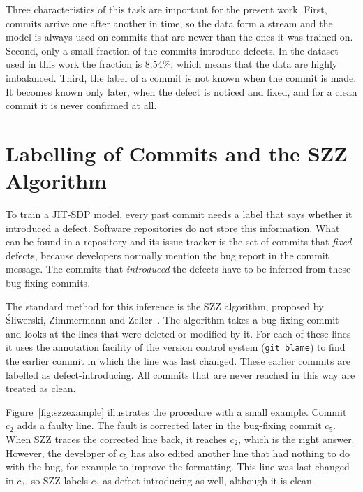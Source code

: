 \documentclass[12pt,a4paper,oneside]{report}
\begin{document}
Three characteristics of this task are important for the present work. First,
commits arrive one after another in time, so the data form a stream and the
model is always used on commits that are newer than the ones it was trained
on. Second, only a small fraction of the commits introduce defects. In the
dataset used in this work the fraction is 8.54\%, which means that the data
are highly imbalanced. Third, the label of a commit is not known when the
commit is made. It becomes known only later, when the defect is noticed and
fixed, and for a clean commit it is never confirmed at all.

\section{Labelling of Commits and the SZZ Algorithm}

To train a JIT-SDP model, every past commit needs a label that says whether
it introduced a defect. Software repositories do not store this information.
What can be found in a repository and its issue tracker is the set of commits
that \emph{fixed} defects, because developers normally mention the bug report
in the commit message. The commits that \emph{introduced} the defects have to
be inferred from these bug-fixing commits.

The standard method for this inference is the SZZ algorithm, proposed by
\'{S}liwerski, Zimmermann and Zeller~\cite{sliwerski2005szz}. The algorithm
takes a bug-fixing commit and looks at the lines that were deleted or modified
by it. For each of these lines it uses the annotation facility of the version
control system (\texttt{git blame}) to find the earlier commit in which the
line was last changed. These earlier commits are labelled as
defect-introducing. All commits that are never reached in this way are treated
as clean.

Figure~\ref{fig:szzexample} illustrates the procedure with a small example.
Commit $c_2$ adds a faulty line. The fault is corrected later in the
bug-fixing commit $c_5$. When SZZ traces the corrected line back, it reaches
$c_2$, which is the right answer. However, the developer of $c_5$ has also
edited another line that had nothing to do with the bug, for example to
improve the formatting. This line was last changed in $c_3$, so SZZ labels
$c_3$ as defect-introducing as well, although it is clean.
\end{document}
